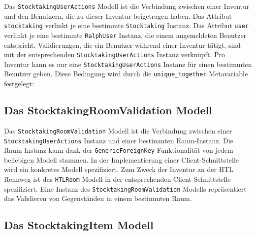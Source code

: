 Das \texttt{StocktakingUserActions} Modell ist die Verbindung zwischen
einer Inventur und den Benutzern, die zu dieser Inventur beigetragen
haben. Das Attribut \texttt{stocktaking} verlinkt je eine bestimmte
\texttt{Stocktaking} Instanz. Das Attribut \texttt{user} verlinkt je
eine bestimmte \texttt{RalphUser} Instanz, die einem angemeldeten
Benutzer entspricht. Validierungen, die ein Benutzer während einer
Inventur tätigt, sind mit der entsprechenden
\texttt{StocktakingUserActions} Instanz verknüpft. Pro Inventur kann es
nur eine \texttt{StocktakingUserActions} Instanz für einen bestimmten
Benutzer geben. Diese Bedingung wird durch die \texttt{unique\_together}
Metavariable \cite{django-doku-models-options} festgelegt:

\begin{Shaded}
\begin{Highlighting}[]
\OperatorTok{=}\NormalTok{ [[}\NormalTok{, }\NormalTok{]]}
\end{Highlighting}
\end{Shaded}

\hypertarget{das-stocktakingroomvalidation-modell}{%
\subsection{Das StocktakingRoomValidation
Modell}\label{das-stocktakingroomvalidation-modell}}

Das \texttt{StocktakingRoomValidation} Modell ist die Verbindung
zwischen einer \texttt{StocktakingUserActions} Instanz und einer
bestimmten Raum-Instanz. Die Raum-Instanz kann dank der
\texttt{GenericForeignKey} Funktionalität
\cite{django-doku-contenttypes} von jedem beliebigen Modell stammen. In
der Implementierung einer Client-Schnittstelle wird ein konkretes Modell
spezifiziert. Zum Zweck der Inventur an der HTL Rennweg ist das
\texttt{HTLRoom} Modell in der entsprechenden Client-Schnittstelle
spezifiziert. Eine Instanz des \texttt{StocktakingRoomValidation}
Modells repräsentiert das Validieren von Gegenständen in einem
bestimmten Raum.

\hypertarget{das-stocktakingitem-modell}{%
\subsection{Das StocktakingItem
Modell}\label{das-stocktakingitem-modell}}

